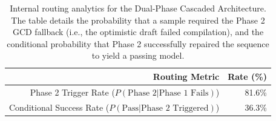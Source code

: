 \vspace{1em}

\begin{table}[htbp]
  \centering
  \caption{Internal routing analytics for the Dual-Phase Cascaded Architecture. The table details the probability that a sample required the Phase 2 GCD fallback (i.e., the optimistic draft failed compilation), and the conditional probability that Phase 2 successfully repaired the sequence to yield a passing model.}
  \label{tab:dual_phase_analytics}
  \begin{tabular}{r r}
    \toprule
    \textbf{Routing Metric} & \textbf{Rate (\%)} \\
    \midrule
    Phase 2 Trigger Rate ($P(\text{Phase 2} | \text{Phase 1 Fails})$) & 81.6\% \\
    Conditional Success Rate ($P(\text{Pass} | \text{Phase 2 Triggered})$) & 36.3\% \\
    \bottomrule
  \end{tabular}
\end{table}